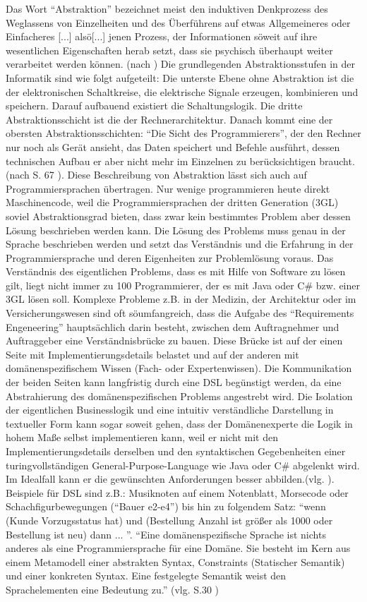 \documentclass[11pt,english,ngerman, headsepline]{scrreprt}
\begin{document}
Das Wort “Abstraktion” bezeichnet meist den induktiven Denkprozess des
Weglassens von Einzelheiten und des Überführens auf etwas Allgemeineres oder
Einfacheres [...] alsö[...] jenen Prozess, der Informationen söweit auf ihre
wesentlichen Eigenschaften herab setzt, dass sie psychisch überhaupt weiter
verarbeitet werden können. (nach \cite{wikiAbsraktion}) Die grundlegenden
Abstraktionsstufen in der Informatik sind wie folgt aufgeteilt: Die unterste
Ebene ohne Abstraktion ist die der elektronischen Schaltkreise, die elektrische
Signale erzeugen, kombinieren und speichern. Darauf aufbauend existiert die
Schaltungslogik. Die dritte Abstraktionsschicht ist die der Rechnerarchitektur.
Danach kommt eine der obersten Abstraktionsschichten: “Die Sicht des
Programmierers”, der den Rechner nur noch als Gerät ansieht, das Daten speichert
und Befehle ausführt, dessen technischen Aufbau er aber nicht mehr im Einzelnen
zu berücksichtigen braucht. (nach S. 67 \cite{rechenberg2000informatik}). Diese
Beschreibung von Abstraktion lässt sich auch auf Programmiersprachen übertragen.
Nur wenige programmieren heute direkt Maschinencode, weil die
Programmiersprachen der dritten Generation (3GL) soviel Abstraktionsgrad bieten,
dass zwar kein bestimmtes Problem aber dessen Lösung beschrieben werden kann.
Die Lösung des Problems muss genau in der Sprache beschrieben werden und setzt
das Verständnis und die Erfahrung in der Programmiersprache und deren
Eigenheiten zur Problemlösung voraus. Das Verständnis des eigentlichen Problems,
dass es mit Hilfe von Software zu lösen gilt, liegt nicht immer zu 100%
Programmierer, der es mit Java oder C\# bzw. einer 3GL lösen soll. Komplexe
Probleme z.B. in der Medizin, der Architektur oder im Versicherungswesen sind
oft söumfangreich, dass die Aufgabe des “Requirements Engeneering”
hauptsächlich darin besteht, zwischen dem Auftragnehmer und Auftraggeber eine
Verständnisbrücke zu bauen. Diese Brücke ist auf der einen Seite mit
Implementierungsdetails belastet und auf der anderen mit domänenspezifischem
Wissen (Fach- oder Expertenwissen). Die Kommunikation der beiden Seiten kann
langfristig durch eine DSL begünstigt werden, da eine Abstrahierung des
domänenspezifischen Problems angestrebt wird. Die Isolation der eigentlichen
Businesslogik und eine intuitiv verständliche Darstellung in textueller Form
kann sogar soweit gehen, dass der Domänenexperte die Logik in hohem Maße selbst
implementieren kann, weil er nicht mit den Implementierungsdetails derselben und
den syntaktischen Gegebenheiten einer turingvollständigen
General-Purpose-Language wie Java oder C\# abgelenkt wird. Im Idealfall kann er
die gewünschten Anforderungen besser abbilden.(vlg. \cite{heiseMPS2}). Beispiele
für DSL sind z.B.: Musiknoten auf einem Notenblatt, Morsecode oder
Schachfigurbewegungen (“Bauer e2-e4”) bis hin zu folgendem Satz: “wenn (Kunde
Vorzugsstatus hat) und (Bestellung Anzahl ist größer als 1000 oder Bestellung
ist neu) dann ... ”. “Eine domänenspezifische Sprache ist nichts anderes als
eine Programmiersprache für eine Domäne. Sie besteht im Kern aus einem
Metamodell einer abstrakten Syntax, Constraints (Statischer Semantik) und einer
konkreten Syntax. Eine festgelegte Semantik weist den Sprachelementen eine
Bedeutung zu.” (vlg. S.30 \cite{mdaDPunkt})
\end{document}

